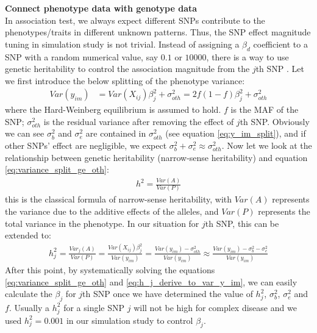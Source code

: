 \documentclass[12pt]{article}
\begin{document}
\textbf{Connect phenotype data with genotype data}\\
In association test, we always expect different SNPs contribute to the phenotypes/traits in different unknown patterns. Thus, the SNP effect magnitude tuning in simulation study is not trivial. Instead of assigning a $\beta_d$ coefficient to a SNP with a random numerical value, say $0.1$ or $10000$, there is a way to use genetic heritability to control the association magnitude from the $j$th SNP \cite{Lynch1998}. Let we first introduce the below splitting of the phenotype variance:
\begin{align}
Var(y_{im} ) & = Var(X_{ij}) \beta_j^2 + \sigma_{oth} ^ 2  = 2f(1-f) \beta_j^2 + \sigma_{oth}^2
\label{eq:variance_split_ge_oth}
\end{align}
where the Hard-Weinberg equilibrium is assumed to hold. $f$ is the MAF of the SNP; $\sigma_{oth}^2$ is the residual variance after removing the effect of $j$th SNP. Obviously we can see $\sigma_b^2$ and $\sigma_e^2$ are contained in $\sigma_{oth}^2$ (see equation \eqref{eq:y_im_split}), and if other SNPs' effect are negligible, we expect $\sigma_b^2 + \sigma_e^2 \approx \sigma_{oth}^2$. Now let we look at the relationship between genetic heritability (narrow-sense heritability) and equation \eqref{eq:variance_split_ge_oth}:
\begin{align}
h^2 = \frac{Var(A)}{Var(P)}
\end{align}
this is the classical formula of narrow-sense heritability, with $Var(A)$ represents the variance due to the additive effects of the alleles, and $Var(P)$ represents the total variance in the phenotype. In our situation for $j$th SNP, this can be extended to:
\begin{align}
h_j^2 = \frac{Var_j(A)}{Var(P)} = \frac{Var(X_{ij}) \beta_j^2 } {Var(y_{im} )} = \frac{Var(y_{im} ) - \sigma^2_{oth} } {Var(y_{im} )} \approx \frac{Var(y_{im} ) - \sigma_b^2 - \sigma_e^2 } {Var(y_{im} )}
\label{eq:h_j_derive_to_var_y_im}
\end{align}
After this point, by systematically solving the equations \eqref{eq:variance_split_ge_oth} and \eqref{eq:h_j_derive_to_var_y_im}, we can easily calculate the $\beta_j$ for $j$th SNP once we have determined the value of $h_j^2$, $\sigma_b^2$, $\sigma_e^2$ and $f$. Usually a $h_j^2$ for a single SNP $j$ will not be high for complex disease and we used $h_j^2 = 0.001$ in our simulation study to control $\beta_j$.
\end{document}
